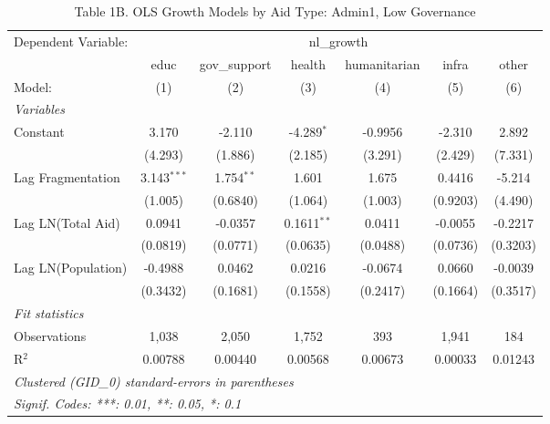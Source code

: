 \begin{table}[H]
   \caption{Table 1B. OLS Growth Models by Aid Type: Admin1, Low Governance}
   \centering
   \begin{tabular}{lcccccc}
      \tabularnewline \midrule \midrule
      Dependent Variable: & \multicolumn{6}{c}{nl\_growth}\\
                         & educ          & gov\_support  & health        & humanitarian & infra    & other \\   
      Model:             & (1)           & (2)           & (3)           & (4)          & (5)      & (6)\\  
      \midrule
      \emph{Variables}\\
      Constant           & 3.170         & -2.110        & -4.289$^{*}$  & -0.9956      & -2.310   & 2.892\\   
                         & (4.293)       & (1.886)       & (2.185)       & (3.291)      & (2.429)  & (7.331)\\   
      Lag Fragmentation  & 3.143$^{***}$ & 1.754$^{**}$  & 1.601         & 1.675        & 0.4416   & -5.214\\   
                         & (1.005)       & (0.6840)      & (1.064)       & (1.003)      & (0.9203) & (4.490)\\   
      Lag LN(Total Aid)  & 0.0941        & -0.0357       & 0.1611$^{**}$ & 0.0411       & -0.0055  & -0.2217\\   
                         & (0.0819)      & (0.0771)      & (0.0635)      & (0.0488)     & (0.0736) & (0.3203)\\   
      Lag LN(Population) & -0.4988       & 0.0462        & 0.0216        & -0.0674      & 0.0660   & -0.0039\\   
                         & (0.3432)      & (0.1681)      & (0.1558)      & (0.2417)     & (0.1664) & (0.3517)\\   
      \midrule
      \emph{Fit statistics}\\
      Observations       & 1,038         & 2,050         & 1,752         & 393          & 1,941    & 184\\  
      R$^2$              & 0.00788       & 0.00440       & 0.00568       & 0.00673      & 0.00033  & 0.01243\\  
      \midrule \midrule
      \multicolumn{7}{l}{\emph{Clustered (GID\_0) standard-errors in parentheses}}\\
      \multicolumn{7}{l}{\emph{Signif. Codes: ***: 0.01, **: 0.05, *: 0.1}}\\
   \end{tabular}
\end{table}



